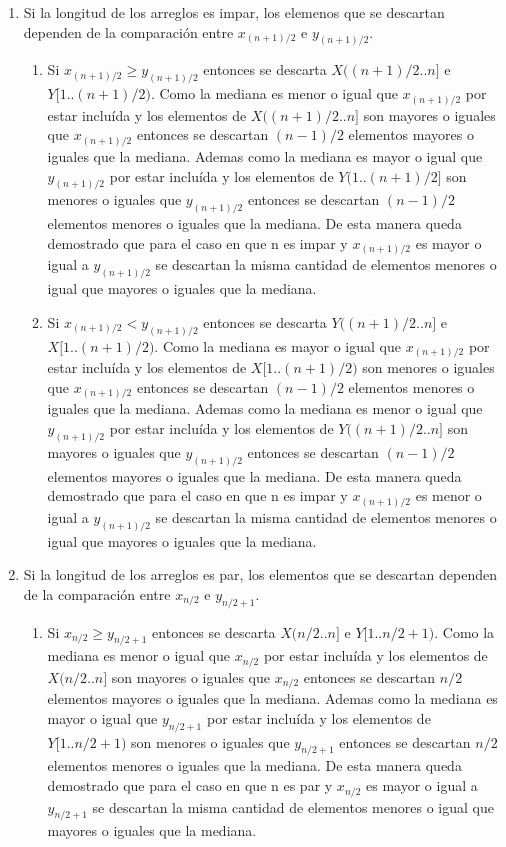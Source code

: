 \documentclass[a4paper,11pt] {article}
\begin{document}
\begin{enumerate}\item
Si la longitud de los arreglos es impar, los elemenos que se descartan dependen de la comparaci\'on entre $x_{(n+1)/2}$ e $y_{(n+1)/2}$.
\begin{enumerate}
\item
Si $x_{(n+1)/2} \geq y_{(n+1)/2}$ entonces se descarta $X((n+1)/2..n]$ e $Y[1..(n+1)/2)$. Como la mediana es menor o igual que $x_{(n+1)/2}$ por estar inclu\'ida y los elementos de $X((n+1)/2..n]$ son mayores o iguales que $x_{(n+1)/2}$ entonces se descartan $(n-1)/2$ elementos mayores o iguales que la mediana. Ademas como la mediana es mayor o igual que $y_{(n+1)/2}$ por estar inclu\'ida y los elementos de $Y(1..(n+1)/2]$ son menores o iguales que $y_{(n+1)/2}$ entonces se descartan $(n-1)/2$ elementos menores o iguales que la mediana. De esta manera queda demostrado que para el caso en que n es impar y $x_{(n+1)/2}$ es mayor o igual a $y_{(n+1)/2}$ se descartan la misma cantidad de elementos menores o igual que mayores o iguales que la mediana.

\item
Si $x_{(n+1)/2} < y_{(n+1)/2}$ entonces se descarta $Y((n+1)/2..n]$ e $X[1..(n+1)/2)$. Como la mediana es mayor o igual que $x_{(n+1)/2}$ por estar inclu\'ida y los elementos de $X[1..(n+1)/2)$ son menores o iguales que $x_{(n+1)/2}$ entonces se descartan $(n-1)/2$ elementos menores o iguales que la mediana. Ademas como la mediana es menor o igual que $y_{(n+1)/2}$ por estar inclu\'ida y los elementos de $Y((n+1)/2..n]$ son mayores o iguales que $y_{(n+1)/2}$ entonces se descartan $(n-1)/2$ elementos mayores o iguales que la mediana. De esta manera queda demostrado que para el caso en que n es impar y $x_{(n+1)/2}$ es menor o igual a $y_{(n+1)/2}$ se descartan la misma cantidad de elementos menores o igual que mayores o iguales que la mediana.
\end{enumerate}

\item
Si la longitud de los arreglos es par, los elementos que se descartan dependen de la comparaci\'on entre $x_{n/2}$ e $y_{n/2+1}$.  

\begin{enumerate}
\item
Si $x_{n/2} \geq y_{n/2+1}$ entonces se descarta $X(n/2..n]$ e $Y[1..n/2+1)$. Como la mediana es menor o igual que $x_{n/2}$ por estar inclu\'ida y los elementos de $X(n/2..n]$ son mayores o iguales que $x_{n/2}$ entonces se descartan $n/2$ elementos mayores o iguales que la mediana. Ademas como la mediana es mayor o igual que $y_{n/2+1}$ por estar inclu\'ida y los elementos de $Y[1..n/2+1)$ son menores o iguales que $y_{n/2+1}$ entonces se descartan $n/2$ elementos menores o iguales que la mediana. De esta manera queda demostrado que para el caso en que n es par y $x_{n/2}$ es mayor o igual a $y_{n/2+1}$ se descartan la misma cantidad de elementos menores o igual que mayores o iguales que la mediana.


\end{enumerate}
\end{enumerate}
\end{document}
